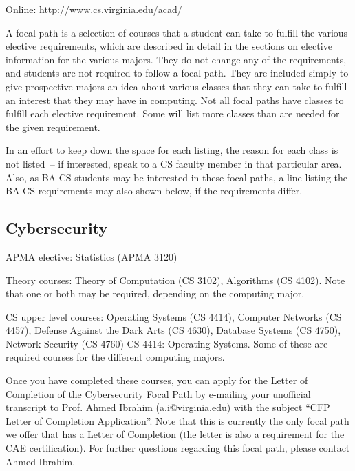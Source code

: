 \noindent Online: \url{http://www.cs.virginia.edu/acad/}

\iffalse


A focal path is a selection of courses that a student can take to
fulfill the various elective requirements, which are described in
detail in the sections on elective information for the various
majors. They do not change any of the requirements, and students are
not required to follow a focal path. They are included simply to give
prospective majors an idea about various classes that they can take to
fulfill an interest that they may have in computing. Not all focal
paths have classes to fulfill each elective requirement. Some will
list more classes than are needed for the given requirement.

In an effort to keep down the space for each listing, the reason for
each class is not listed~-- if interested, speak to a CS faculty
member in that particular area. Also, as BA CS students may be
interested in these focal paths, a line listing the BA CS requirements
may also shown below, if the requirements differ.


\subsection{Cybersecurity}

\begin{itemlist}
\item APMA elective: Statistics (APMA 3120)
\item Theory courses: Theory of Computation (CS 3102), Algorithms (CS
  4102).  Note that one or both may be required, depending on the
  computing major.
\item CS upper level courses: Operating Systems (CS 4414), Computer
  Networks (CS 4457), Defense Against the Dark Arts (CS 4630),
  Database Systems (CS 4750), Network Security (CS 4760) CS 4414:
  Operating Systems.  Some of these are required courses for the
  different computing majors.
\end{itemlist}

Once you have completed these courses, you can apply for the Letter of
Completion of the Cybersecurity Focal Path by e-mailing your
unofficial transcript to Prof. Ahmed Ibrahim (a.i@virginia.edu) with
the subject ``CFP Letter of Completion Application''.  Note that this
is currently the only focal path we offer that has a Letter of
Completion (the letter is also a requirement for the CAE
certification).
For further questions regarding this focal path, please contact Ahmed
Ibrahim.


